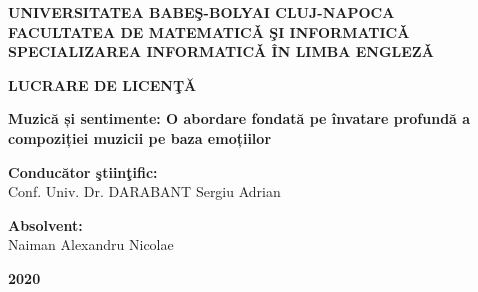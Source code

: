 \begin{titlepage}
    \begin{center}

        \large
        \textbf{UNIVERSITATEA BABEŞ-BOLYAI CLUJ-NAPOCA\\
            \vspace{0.5cm}
            FACULTATEA DE MATEMATICǍ ŞI INFORMATICǍ \\
            \vspace{0.5cm}
            SPECIALIZAREA INFORMATICǍ ÎN LIMBA ENGLEZǍ}

        \vfill


        \Large
        \textbf{LUCRARE DE LICENŢĂ}

        \vspace{0.5cm}
        \Large
        \textbf{Muzică și sentimente: O abordare fondată pe învatare profundă a compoziției muzicii pe baza emoțiilor}

        \vfill

        \begin{justify}
            \textbf{Conducător ştiinţific:\\}
            Conf. Univ. Dr. DARABANT Sergiu Adrian
        \end{justify}

        \vspace{0.8cm}

        \begin{flushright}
            \textbf{Absolvent:\\}
            Naiman Alexandru Nicolae
        \end{flushright}

        \vspace{2cm}


        \textbf{2020}

    \end{center}
\end{titlepage}